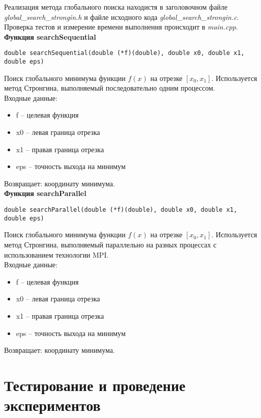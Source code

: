 \documentclass{article}
\begin{document}
\par Реализация метода глобального поиска находистя в заголовочном файле \emph{global\_search\_strongin.h} и файле исходного кода \emph{global\_search\_strongin.c}. Проверка тестов и измерение времени выполнения происходит в \emph{main.cpp}. 
\\
\textbf{Функция searchSequential}
\begin{lstlisting}
double searchSequential(double (*f)(double), double x0, double x1, double eps)
\end{lstlisting}
Поиск глобального минимума функции \(f(x)\) на отрезке \([x_0, x_1]\). Используется метод Стронгина, выполняемый последовательно одним процессом.
\\Входные данные:
\begin{itemize}
    \item f -- целевая функция
    \item x0 -- левая граница отрезка
    \item x1 -- правая граница отрезка
    \item eps -- точность выхода на минимум
\end{itemize}
Возвращает: координату минимума.
\\
\textbf{Функция searchParallel} 
\begin{lstlisting}
double searchParallel(double (*f)(double), double x0, double x1, double eps)
\end{lstlisting}
Поиск глобального минимума функции \(f(x)\) на отрезке \([x_0, x_1]\). Используется метод Стронгина, выполняемый параллельно на разных процессах с использованием технологии MPI.
\\Входные данные:
\begin{itemize}
    \item f -- целевая функция
    \item x0 -- левая граница отрезка
    \item x1 -- правая граница отрезка
    \item eps -- точность выхода на минимум
\end{itemize}
Возвращает: координату минимума.

\newpage
\section*{Тестирование и проведение экспериментов}
\end{document}
